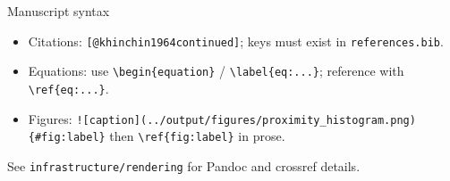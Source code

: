\documentclass[
  ignorenonframetext,
]{beamer}
\author{\texorpdfstring{}{}}
\date{}
\providecommand{\tightlist}{%
  \setlength{\itemsep}{0pt}\setlength{\parskip}{0pt}}
\begin{document}
\begin{frame}[fragile]{Manuscript syntax}
\protect{}\label{manuscript-syntax}
\begin{itemize}
\tightlist
\item
  Citations: \texttt{{[}@khinchin1964continued{]}}; keys must exist in
  \texttt{references.bib}.
\item
  Equations: use \texttt{\textbackslash{}begin\{equation\}} /
  \texttt{\textbackslash{}label\{eq:...\}}; reference with
  \texttt{\textbackslash{}ref\{eq:...\}}.
\item
  Figures:
  \texttt{!{[}caption{]}(../output/figures/proximity\_histogram.png)\{\#fig:label\}}
  then \texttt{\textbackslash{}ref\{fig:label\}} in prose.
\end{itemize}

See \texttt{infrastructure/rendering} for Pandoc and crossref details.
\end{frame}
\end{document}

